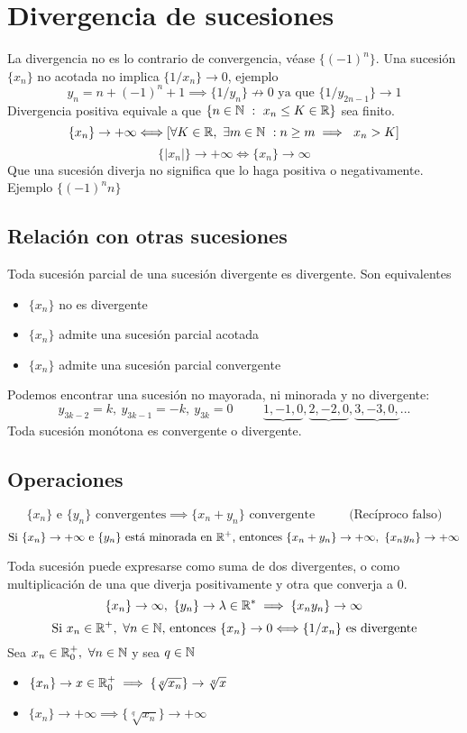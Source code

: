 \section{Divergencia de sucesiones}
La divergencia no es lo contrario de convergencia, véase 
$\{ (-1)^n \}$. 
Una sucesión $\{x_n\}$ no acotada no implica $\{1/x_n\} \rightarrow 0$, ejemplo
$$ y_n = n+(-1)^n+1 \implies \{1/y_n\}\not\rightarrow 0 \text{ ya que } \{1/y_{2n-1}\}\rightarrow 1 $$
Divergencia positiva equivale a que 
$\{n\in\mathbb{N} \ : \ x_n\leq K\in\mathbb{R} \}$ sea finito.
$$ \{x_n\}\rightarrow +\infty \Longleftrightarrow
 \left[ \forall K\in\mathbb{R}, \ \exists m\in\mathbb{N} \ : n\geq m \implies \ x_n> K \right]$$
$$ \{ |x_n| \} \rightarrow +\infty \Longleftrightarrow \{ x_n \} \rightarrow \infty$$
Que una sucesión diverja no significa que lo haga positiva o negativamente. Ejemplo $\{ (-1)^nn \}$

\subsection{Relación con otras sucesiones}
Toda sucesión parcial de una sucesión divergente es divergente.
Son equivalentes
\begin{itemize}
	\item $\{ x_n \}$ no es divergente
	\item $\{ x_n \}$ admite una sucesión parcial acotada
	\item $\{ x_n \}$ admite una sucesión parcial convergente
\end{itemize} 
Podemos encontrar una sucesión no mayorada, ni minorada y no divergente: 
$$y_{3k-2}=k, \ y_{3k-1}=-k ,\  y_{3k}=0 \hspace{1cm} \underbrace{1,-1,0},\underbrace{2,-2,0},\underbrace{3,-3,0,}...$$
Toda sucesión monótona es convergente o divergente.

\subsection{Operaciones}
$$ \{ x_n \} \text{ e } \{ y_n \} \text{ convergentes} \implies \{ x_n+y_n \} \text{ convergente } \hspace{1cm}\text{(Recíproco falso)}  $$
$$ \text{Si } \{ x_n \}\rightarrow +\infty \text{ e } \{ y_n \} \text{ está minorada en }\mathbb{R}^+ \text{, entonces } \{ x_n+y_n \}\rightarrow +\infty, \ \{x_ny_n\}\rightarrow +\infty $$

Toda sucesión puede expresarse como suma de dos divergentes, o como multiplicación de una que diverja positivamente y otra que converja a 0.
$$ \{ x_n \}\rightarrow\infty,\ \{ y_n \}\rightarrow\lambda\in\mathbb{R}^* \implies \{ x_ny_n \}\rightarrow\infty $$
$$\text{Si } x_n\in\mathbb{R}^+, \ \forall n\in\mathbb{N}\text{, entonces } \{ x_n \}\rightarrow 0 \Longleftrightarrow \{ 1/x_n \} \text{ es divergente} $$
Sea $x_n\in\mathbb{R}^+_0, \ \forall n\in\mathbb{N}$ y sea $q\in\mathbb{N}$
\begin{itemize}
	\item $\{ x_n \}\rightarrow x\in\mathbb{R}^+_0 \implies \{ \sqrt[q]{x_n} \}\rightarrow \sqrt[q]{x}$
	\item $\{ x_n \}\rightarrow +\infty \implies \{ \sqrt[q]{x_n} \}\rightarrow +\infty$	
\end{itemize}